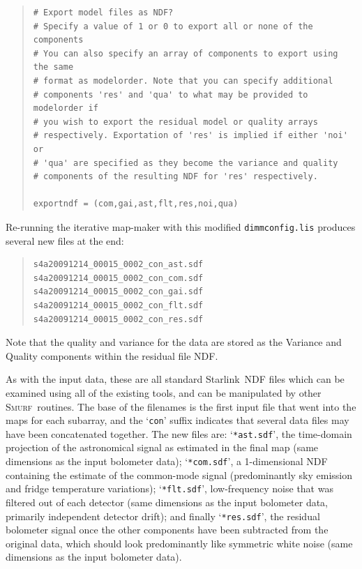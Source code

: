 \documentclass[twoside,11pt]{article}
\newenvironment{myquote}{\begin{quote}\begin{small}}{\end{small}\end{quote}}
\newcommand{\starlink}{\htmladdnormallink{Starlink}{http://starlink.jach.hawaii.edu}}
\newcommand{\smurf}{\xref{\textsc{Smurf}}{sun258}{}}
\newcommand{\htmladdnormallink}[2]{#1}
\newcommand{\xref}[3]{#1}
\renewcommand{\_}{\texttt{\symbol{95}}}
\begin{document}
\begin{myquote}
\begin{verbatim}
# Export model files as NDF?
# Specify a value of 1 or 0 to export all or none of the components
# You can also specify an array of components to export using the same
# format as modelorder. Note that you can specify additional
# components 'res' and 'qua' to what may be provided to modelorder if
# you wish to export the residual model or quality arrays
# respectively. Exportation of 'res' is implied if either 'noi' or
# 'qua' are specified as they become the variance and quality
# components of the resulting NDF for 'res' respectively.

exportndf = (com,gai,ast,flt,res,noi,qua)
\end{verbatim}
\end{myquote}

Re-running the iterative map-maker with this modified
\texttt{dimmconfig.lis} produces several new files at the end:

\begin{myquote}
\begin{verbatim}
s4a20091214_00015_0002_con_ast.sdf
s4a20091214_00015_0002_con_com.sdf
s4a20091214_00015_0002_con_gai.sdf
s4a20091214_00015_0002_con_flt.sdf
s4a20091214_00015_0002_con_res.sdf
\end{verbatim}
\end{myquote}

Note that the quality and variance for the data are stored as
the Variance and Quality components within the residual file NDF.

As with the input data, these are all standard \starlink\ NDF files
which can be examined using all of the existing tools, and can be
manipulated by other \smurf\ routines. The base of the filenames is
the first input file that went into the maps for each subarray, and
the `\texttt{con}' suffix indicates that several data files may have
been concatenated together. The new files are: `\texttt{*ast.sdf}',
the time-domain projection of the astronomical signal as estimated in
the final map (same dimensions as the input bolometer data);
`\texttt{*com.sdf}', a 1-dimensional NDF containing the estimate of
the common-mode signal (predominantly sky emission and fridge
temperature variations); `\texttt{*flt.sdf}', low-frequency noise that
was filtered out of each detector (same dimensions as the input
bolometer data, primarily independent detector drift); and finally
`\texttt{*res.sdf}', the residual bolometer signal once the other
components have been subtracted from the original data, which should
look predominantly like symmetric white noise (same dimensions as the
input bolometer data).
\end{document}
